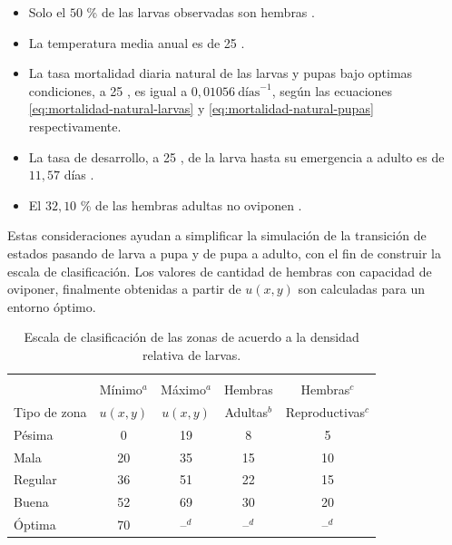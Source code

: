 \begin{itemize}
    \item Solo el $50$ \% de las larvas observadas son hembras \cite{otero2006stochastic, manrique1998desarrollo}.
    \item La temperatura media anual es de 25 \textcelsius \cite{website:mspbsHistoria2014}.
    \item La tasa mortalidad diaria natural de las larvas y pupas bajo optimas condiciones, a 25 \textcelsius, es igual a $0,01056\ \text{días}^{-1}$, según las ecuaciones \eqref{eq:mortalidad-natural-larvas} y \eqref{eq:mortalidad-natural-pupas} respectivamente.
    \item La tasa de desarrollo, a 25 \textcelsius, de la larva hasta su emergencia a adulto es de $11,57$ días \cite{rueda1990temperature}.
    \item El $32,10$ \% de las hembras adultas no oviponen \cite{osoriopontificia}.
\end{itemize}

Estas consideraciones ayudan a simplificar la simulación de la transición de estados pasando de
larva a pupa y de pupa a adulto, con el fin de construir la escala de clasificación. Los valores
de cantidad de hembras con capacidad de oviponer, finalmente obtenidas a partir de $u(x, y)$ son
calculadas para un entorno óptimo.

\begin{table}[!hptb]
    \begin{center}
    \begin{minipage}{\textwidth}
    \begin{center}
        \caption{\label{tab:cap4-puntaje-zona} Escala de clasificación de las zonas de acuerdo a la densidad relativa de larvas.}
        \begin{tabular}{p{3cm} c c c c}
            \hline \\
                         & Mínimo$^a$ & Máximo$^a$ & Hembras     & Hembras$^c$ \\
            Tipo de zona & $u(x, y)$   & $u(x, y)$   & Adultas$^b$ & Reproductivas$^c$ \\
            \hline
            \hline
            Pésima  & 0  & 19 & 8  & 5 \\
            Mala    & 20 & 35 & 15 & 10\\
            Regular & 36 & 51 & 22 & 15\\
            Buena   & 52 & 69 & 30 & 20\\
            Óptima  & 70 & --$^d$ & --$^d$ & --$^d$\\
        \end{tabular}
    \end{center}
    \end{minipage}
    \end{center}
\end{table}

